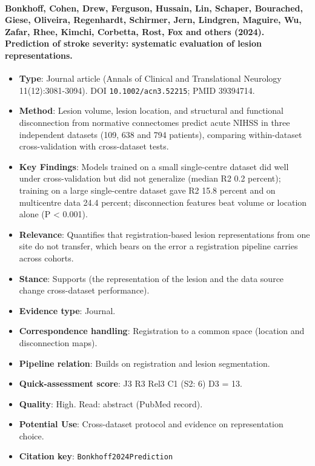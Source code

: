 \documentclass[journal,onecolumn]{IEEEtran}
\begin{document}
\paragraph{Bonkhoff, Cohen, Drew, Ferguson, Hussain, Lin, Schaper, Bourached, Giese, Oliveira, Regenhardt, Schirmer, Jern, Lindgren, Maguire, Wu, Zafar, Rhee, Kimchi, Corbetta, Rost, Fox and others (2024). Prediction of stroke severity: systematic evaluation of lesion representations.~\cite{Bonkhoff2024Prediction}}\mbox{}

\begin{itemize}

\item{} \textbf{Type}: Journal article (Annals of Clinical and Translational Neurology 11(12):3081-3094). DOI \nolinkurl{10.1002/acn3.52215}; PMID 39394714.

\item{} \textbf{Method}: Lesion volume, lesion location, and structural and functional disconnection from normative connectomes predict acute NIHSS in three independent datasets (109, 638 and 794 patients), comparing within-dataset cross-validation with cross-dataset tests.

\item{} \textbf{Key Findings}: Models trained on a small single-centre dataset did well under cross-validation but did not generalize (median R2 0.2 percent); training on a large single-centre dataset gave R2 15.8 percent and on multicentre data 24.4 percent; disconnection features beat volume or location alone (P \textless{} 0.001).

\item{} \textbf{Relevance}: Quantifies that registration-based lesion representations from one site do not transfer, which bears on the error a registration pipeline carries across cohorts.

\item{} \textbf{Stance}: Supports (the representation of the lesion and the data source change cross-dataset performance).

\item{} \textbf{Evidence type}: Journal.

\item{} \textbf{Correspondence handling}: Registration to a common space (location and disconnection maps).

\item{} \textbf{Pipeline relation}: Builds on registration and lesion segmentation.

\item{} \textbf{Quick-assessment score}: J3 R3 Rel3 C1 (S2: 6) D3 = 13.

\item{} \textbf{Quality}: High. Read: abstract (PubMed record).

\item{} \textbf{Potential Use}: Cross-dataset protocol and evidence on representation choice.

\item{} \textbf{Citation key}: \texttt{Bonkhoff2024Prediction}

\end{itemize}
\end{document}
